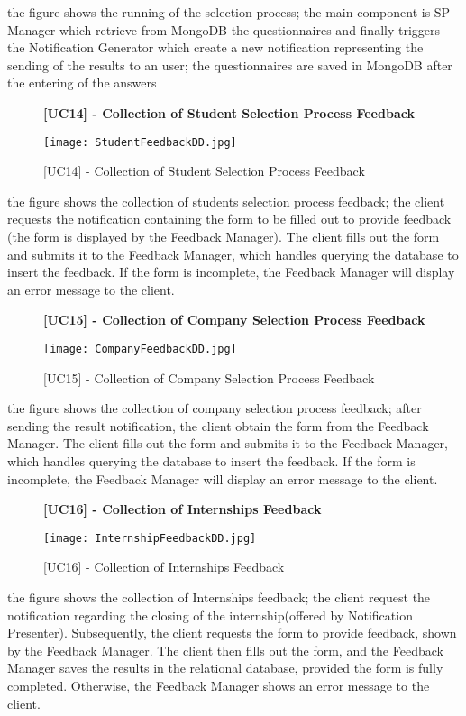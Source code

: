 		the figure shows the running of the selection process; the main component is SP Manager which retrieve from MongoDB the questionnaires and finally triggers the Notification Generator which create a new notification representing the sending of the results to an user; the questionnaires are saved in MongoDB after the entering of the answers
		
		\begin{figure}[H]
			\centering
			{\bfseries [UC14] - Collection of Student Selection Process Feedback}
			\caption{[UC14] - Collection of Student Selection Process Feedback}
			\texttt{[image: StudentFeedbackDD.jpg]}
		\end{figure}
		
		the figure shows the collection of students selection process feedback; the client requests the notification containing the form to be filled out to provide feedback (the form is displayed by the Feedback Manager). The client fills out the form and submits it to the Feedback Manager, which handles querying the database to insert the feedback. If the form is incomplete, the Feedback Manager will display an error message to the client.
		
		
		\begin{figure}[H]
			\centering
			{\bfseries [UC15] - Collection of Company Selection Process Feedback}
			\caption{[UC15] - Collection of Company Selection Process Feedback}
			\texttt{[image: CompanyFeedbackDD.jpg]}
			
		\end{figure}
		
		
		the figure shows the collection of company selection process feedback; after sending the result notification, the client obtain the form from the Feedback Manager. The client fills out the form and submits it to the Feedback Manager, which handles querying the database to insert the feedback. If the form is incomplete, the Feedback Manager will display an error message to the client.
		
		
		\begin{figure}[H]
			\centering
			{\bfseries [UC16] - Collection of Internships Feedback}
			\caption{[UC16] - Collection of Internships Feedback}
			\texttt{[image: InternshipFeedbackDD.jpg]}
			
		\end{figure}
		
		the figure shows the collection of Internships feedback; the client request the notification regarding the closing of the internship(offered by Notification Presenter). Subsequently, the client requests the form to provide feedback, shown by the Feedback Manager. The client then fills out the form, and the Feedback Manager saves the results in the relational database, provided the form is fully completed. Otherwise, the Feedback Manager shows an error message to the client.
		
